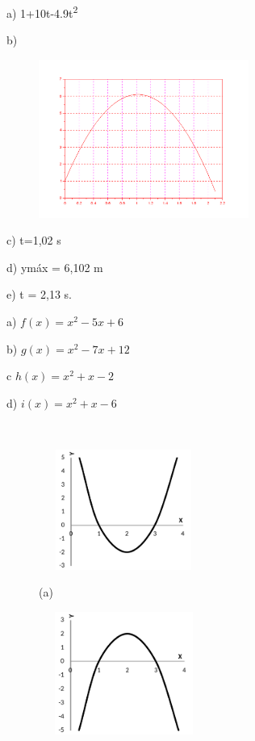 \begin{enumerate}[label=\thechapter.\arabic*]
\ansitem{} a) 1+10t-4.9t\textsuperscript{2} 

b) 

\begin{figure}[H]
	\begin{Center}
		\includegraphics[width=2.71in,height=2.04in]{capitulos/funcao_do_segundo_grau/media/image37.pdf}
	\end{Center}
\end{figure}

	c) t=1,02 s

	d) ymáx = 6,102 m

	e) t = 2,13 s.

\ansitem{} a)  \( f \left( x \right) =x^{2}-5x+6 \)

    b) \( g \left( x \right) =x^{2}-7x+12 \) 

	c  \( h \left( x \right) =x^{2}+x-2 \)

	d)  \( i \left( x \right) =x^{2}+x-6 \)

\ansitem{} ~

\begin{multicols}{2}
\begin{figure}[H]
        \includegraphics[width=2.19in,height=1.55in]{capitulos/funcao_do_segundo_grau/media/image38.pdf}
        
        (a)
\end{figure}

\begin{figure}[H]
        \includegraphics[width=2.2in,height=1.58in]{capitulos/funcao_do_segundo_grau/media/image39.pdf}
        

\end{figure}
\end{multicols}
\end{enumerate}
